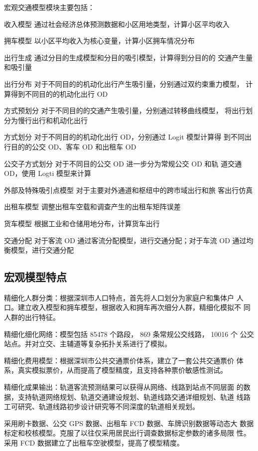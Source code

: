 宏观交通模型模块主要包括：
\begin{para}
\item[收入模型] 通过社会经济总体预测数据和小区用地类型，计算小区平均收入
\item[拥车模型] 以小区平均收入为核心变量，计算小区拥车情况分布
\item[出行生成] 通过分目的生成模型和分目的吸引模型，计算得到分目的的
交通产生量和吸引量
\item[出行分布] 对于不同目的的机动化出行产生吸引量，分别通过双约束重力模型，
计算得到不同目的的机动化出行 OD
\item[方式预划分] 对于不同目的的交通产生吸引量，分别通过转移曲线模型，
将出行划分为慢行出行和机动化出行
\item[方式划分] 对于不同目的的机动化出行 OD，分别通过 Logit 模型计算得
到不同出行目的的公交 OD、客车 OD 和出租车 OD
\item[公交子方式划分] 对于不同目的公交 OD 进一步分为常规公交 OD 和轨
道交通 OD，使用 Logti 模型来计算
\item[外部及特殊吸引点模型] 对于主要对外通道和枢纽中的跨市域出行和旅
客出行仿真
\item[出租车模型] 调整出租车空载和调查产生的出租车矩阵误差
\item[货车模型] 根据工业和仓储用地分布，计算货车出行
\item[交通分配] 对于客流 OD 通过客流分配模型，进行交通分配；对于车流
OD 通过均衡模型，进行交通分配 
\end{para}

\subsection{宏观模型特点}
精细化人群分类：根据深圳市人口特点，首先将人口划分为家庭户和集体户
人口。建立收入模型和拥车模型，根据收入和拥车再次细分人群，精细化模拟不
同人群的出行特征。

精细化细化网络：模型包括 85478 个路段， 869 条常规公交线路， 10016 个
公交站点。并对立交、主辅道等复杂拓扑关系进行了模拟。

精细化费用模型：根据深圳市公共交通票价体系，建立了一套公共交通票价
体系，真实模拟票价，从而提高了模型精度，且支持各种票价敏感性测试。

精细化成果输出：轨道客流预测结果可以获得从网络、线路到站点不同层面
的数据，支持轨道网络规划、轨道交通建设规划、轨道线路交通详细规划、轨道
线路工可研究、轨道线路初步设计研究等不同深度的轨道相关规划。

采用刷卡数据、公交 GPS 数据、出租车 FCD 数据、车牌识别数据等动态大
数据标定和校核模型。克服了以往仅采用居民出行调查数据标定参数的诸多局限
性。采用 FCD 数据建立了出租车空驶模型，提高了模型精度。

